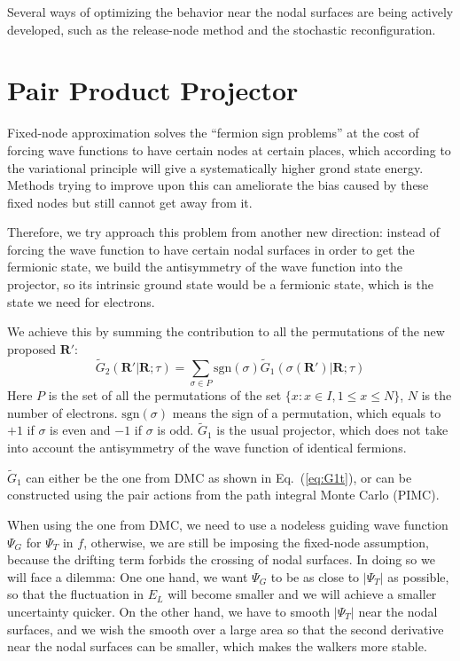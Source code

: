 \documentclass[aps,prl,reprint,groupedaddress]{revtex4-1}
\begin{document}
Several ways of optimizing the behavior near the nodal surfaces are being actively developed, such as the release-node method and the stochastic reconfiguration.

\section{Pair Product Projector}

Fixed-node approximation solves the ``fermion sign problems'' at the cost of forcing wave functions to have certain nodes at certain places, which according to the variational principle will give a systematically higher grond state energy.
Methods trying to improve upon this can ameliorate the bias caused by these fixed nodes but still cannot get away from it.

Therefore, we try approach this problem from another new direction: instead of forcing the wave function to have certain nodal surfaces in order to get the fermionic state, we build the antisymmetry of the wave function into the projector, so its intrinsic ground state would be a fermionic state, which is the state we need for electrons.

We achieve this by summing the contribution to all the permutations of the new proposed $\bm{R'}$:
\begin{equation}
\label{eq:ppp}
\widetilde{G}_2(\bm{R'}|\bm{R};\tau)
= \sum\limits_{\sigma\in P} \mathrm{sgn}(\sigma) \widetilde{G}_1(\sigma(\bm{R'})|\bm{R};\tau)
\end{equation}
Here $P$ is the set of all the permutations of the set $\{x:x \in I, 1 \leq x \leq N\}$, $N$ is the number of electrons.
$\mathrm{sgn}(\sigma)$ means the sign of a permutation, which equals to $+1$ if $\sigma$ is even and $-1$ if $\sigma$ is odd.
$\widetilde{G}_1$ is the usual projector, which does not take into account the antisymmetry of the wave function of identical fermions.

$\widetilde{G}_1$ can either be the one from DMC as shown in Eq.~(\ref{eq:G1t}), or can be constructed using the pair actions from the path integral Monte Carlo (PIMC).

When using the one from DMC, we need to use a nodeless guiding wave function $\Psi_G$ for $\Psi_T$ in $f$, otherwise, we are still be imposing the fixed-node assumption, because the drifting term forbids the crossing of nodal surfaces.
In doing so we will face a dilemma:
One one hand, we want $\Psi_G$ to be as close to $|\Psi_T|$ as possible, so that the fluctuation in $E_L$ will become smaller and we will achieve a smaller uncertainty quicker.
On the other hand, we have to smooth $|\Psi_T|$ near the nodal surfaces, and we wish the smooth over a large area so that the second derivative near the nodal surfaces can be smaller, which makes the walkers more stable.
\end{document}
